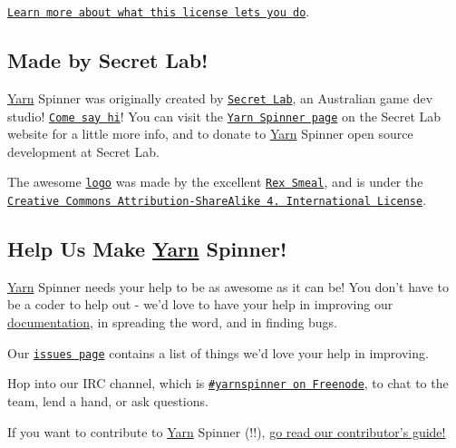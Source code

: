 \begin{DoxyItemize}
\item \href{https://tldrlegal.com/license/mit-license}{\tt Learn more about what this license lets you do}.
\end{DoxyItemize}

\subsection*{Made by Secret Lab!}

\hyperlink{a00031}{Yarn} Spinner was originally created by \href{http://secretlab.com.au}{\tt Secret Lab}, an Australian game dev studio! \href{https://twitter.com/thesecretlab}{\tt Come say hi}! You can visit the \href{http://www.secretlab.com.au/yarnspinner}{\tt Yarn Spinner page} on the Secret Lab website for a little more info, and to donate to \hyperlink{a00031}{Yarn} Spinner open source development at Secret Lab.

The awesome \href{Documentation/YarnSpinnerLogo.png}{\tt logo} was made by the excellent \href{https://twitter.com/RexSmeal}{\tt Rex Smeal}, and is under the \href{http://creativecommons.org/licenses/by-sa/4.0/}{\tt Creative Commons Attribution-\/\-Share\-Alike 4. International License}.

\subsection*{Help Us Make \hyperlink{a00031}{Yarn} Spinner!}

\hyperlink{a00031}{Yarn} Spinner needs your help to be as awesome as it can be! You don't have to be a coder to help out -\/ we'd love to have your help in improving our \hyperlink{a00012}{documentation}, in spreading the word, and in finding bugs.


\begin{DoxyItemize}
\item Our \href{https://github.com/thesecretlab/YarnSpinner/issues}{\tt issues page} contains a list of things we'd love your help in improving.
\item Hop into our I\-R\-C channel, which is \href{https://webchat.freenode.net/?channels=yarnspinner}{\tt \#yarnspinner on Freenode}, to chat to the team, lend a hand, or ask questions.
\end{DoxyItemize}

If you want to contribute to \hyperlink{a00031}{Yarn} Spinner (!!), \hyperlink{a00002}{go read our contributor's guide!} 